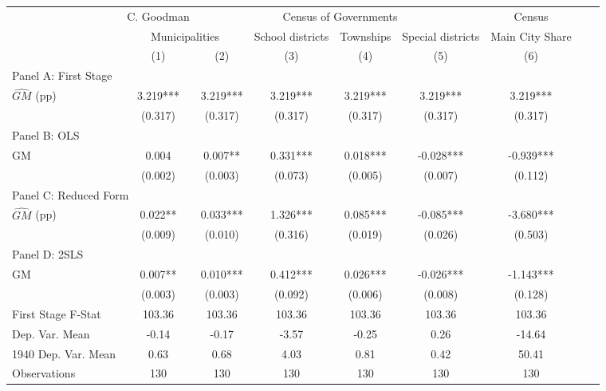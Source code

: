  \begin{tabular}{l*{8}{c}} \toprule
&\multicolumn{1}{c}{C. Goodman}&\multicolumn{4}{c}{Census of Governments}&\multicolumn{1}{c}{Census}\\\cmidrule(lr){2-2}\cmidrule(lr){3-6}\cmidrule(lr){7-7}
&\multicolumn{2}{c}{Municipalities}&\multicolumn{1}{c}{School districts}&\multicolumn{1}{c}{Townships}&\multicolumn{1}{c}{Special districts}&\multicolumn{1}{c}{Main City Share}\\\cmidrule(lr){2-3}\cmidrule(lr){4-6}\cmidrule(lr){7-7}
&\multicolumn{1}{c}{(1)}&\multicolumn{1}{c}{(2)}&\multicolumn{1}{c}{(3)}&\multicolumn{1}{c}{(4)}&\multicolumn{1}{c}{(5)}&\multicolumn{1}{c}{(6)}\\
\cmidrule(lr){1-7}
\multicolumn{6}{l}{Panel A: First Stage}\\
\cmidrule(lr){1-7}
$\widehat{GM}$ (pp)&    3.219***&    3.219***&    3.219***&    3.219***&    3.219***&    3.219***\\
                &  (0.317)   &  (0.317)   &  (0.317)   &  (0.317)   &  (0.317)   &  (0.317)   \\
\cmidrule(lr){1-7}
\multicolumn{6}{l}{Panel B: OLS}\\
\cmidrule(lr){1-7}
GM              &    0.004   &    0.007** &    0.331***&    0.018***&   -0.028***&   -0.939***\\
                &  (0.002)   &  (0.003)   &  (0.073)   &  (0.005)   &  (0.007)   &  (0.112)   \\
\cmidrule(lr){1-7}
\multicolumn{6}{l}{Panel C: Reduced Form}\\
\cmidrule(lr){1-7}
$\widehat{GM}$ (pp)&    0.022** &    0.033***&    1.326***&    0.085***&   -0.085***&   -3.680***\\
                &  (0.009)   &  (0.010)   &  (0.316)   &  (0.019)   &  (0.026)   &  (0.503)   \\
\cmidrule(lr){1-7}
\multicolumn{6}{l}{Panel D: 2SLS}\\
\cmidrule(lr){1-7}
GM              &    0.007** &    0.010***&    0.412***&    0.026***&   -0.026***&   -1.143***\\
                &  (0.003)   &  (0.003)   &  (0.092)   &  (0.006)   &  (0.008)   &  (0.128)   \\
\midrule
First Stage F-Stat&   103.36   &   103.36   &   103.36   &   103.36   &   103.36   &   103.36   \\
Dep. Var. Mean  &    -0.14   &    -0.17   &    -3.57   &    -0.25   &     0.26   &   -14.64   \\
1940 Dep. Var. Mean&     0.63   &     0.68   &     4.03   &     0.81   &     0.42   &    50.41   \\
Observations    &      130   &      130   &      130   &      130   &      130   &      130   \\
 \bottomrule \end{tabular}
